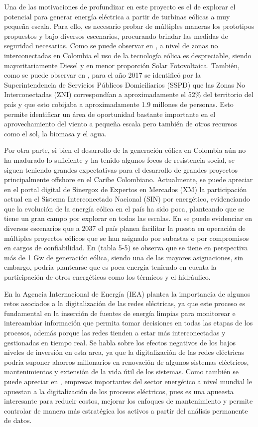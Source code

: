 \documentclass[letterpaper,12pt, oneside]{book}
\begin{document}
Una de las motivaciones de profundizar en este proyecto es el de explorar el potencial para generar energía eléctrica a partir de turbinas eólicas a muy pequeña escala. Para ello, es necesario probar de múltiples maneras los prototipos propuestos y bajo diversos escenarios, procurando brindar las medidas de seguridad necesarias. Como se puede observar en \cite{ref43}, a nivel de zonas no interconectadas en Colombia el uso de la tecnología eólica es despreciable, siendo mayoritariamente Diesel y en menor proporción Solar Fotovoltaica. También, como se puede observar en \cite{ref15}, para el año 2017 se identificó por la Superintendencia de Servicios Públicos Domiciliarios (SSPD) que las Zonas No Interconectadas (ZNI) correspondían a aproximadamente el 52\% del territorio del país y que esto cobijaba a aproximadamente 1.9 millones de personas. Esto permite identificar un área de oportunidad bastante importante en el aprovechamiento del viento a pequeña escala pero también de otros recursos como el sol, la biomasa y el agua. 

Por otra parte, si bien el desarrollo de la generación eólica en Colombia aún no ha madurado lo suficiente y ha tenido algunos focos de resistencia social, se siguen teniendo grandes expectativas para el desarrollo de grandes proyectos principalmente offshore en el Caribe Colombiano. Actualmente, se puede apreciar en el portal digital de Sinergox de Expertos en Mercados (XM) \cite{ref16} la participación actual en el Sistema Interconectado Nacional (SIN) por energético, evidenciando que la evolución de la energía eólica en el país ha sido poca, planteando que se tiene un gran campo por explorar en todas las escalas. En \cite{ref1} se puede evidenciar en diversos escenarios que a 2037 el país planea facilitar la puesta en operación de múltiples proyectos eólicos que se han asignado por subastas o por compromisos en cargos de confiabilidad. En \cite{ref1} (tabla 5-5) se observa que se tiene en perspectiva más de 1 Gw de generación eólica, siendo una de las mayores asignaciones, sin embargo, podría plantearse que es poca energía teniendo en cuenta la participación de otros energéticos como los térmicos y el hidráulico. 

En \cite{ref17} la Agencia Internacional de Energía (IEA) plantea la importancia de algunos retos asociados a la digitalización de las redes eléctricas, ya que este proceso es fundamental en la inserción de fuentes de energía limpias para monitorear e intercambiar información que permita tomar decisiones en todas las etapas de los procesos, además porque las redes tienden a estar más interconectadas y gestionadas en tiempo real. Se habla sobre los efectos negativos de los bajos niveles de inversión en esta area, ya que la digitalización de las redes eléctricas podría suponer ahorros millonarios en renovación de algunos sistemas eléctricos, mantenimientos y extensión de la vida útil de los sistemas. Como también se puede apreciar en \cite{ref18}, empresas importantes del sector energético a nivel mundial le apuestan a la digitalización de los procesos eléctricos, pues es una apueesta interesante para reducir costos, mejorar los enfoques de mantenimiento y permite controlar de manera más estratégica los activos a partir del análisis permanente de datos. 
\end{document}
